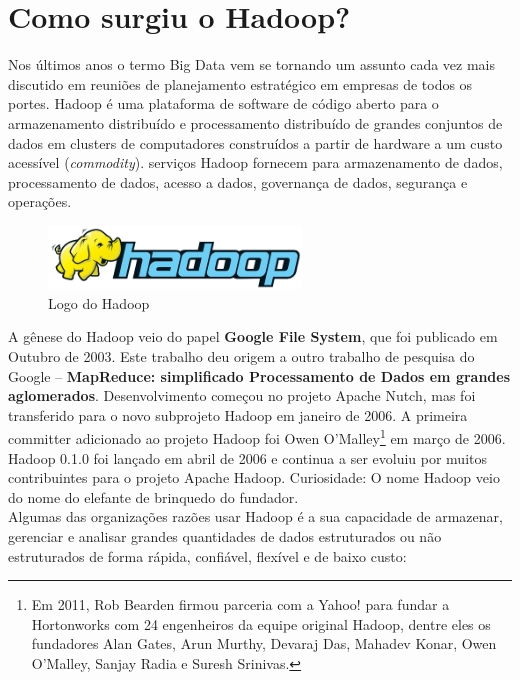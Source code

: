 \documentclass[a4paper,11pt]{article}
\begin{document}
\section{Como surgiu o Hadoop?}
Nos últimos anos o termo Big Data vem se tornando um assunto cada vez mais discutido em reuniões de planejamento estratégico em empresas de todos os portes. Hadoop é uma plataforma de software de código aberto para o armazenamento distribuído e processamento distribuído de grandes conjuntos de dados em clusters de computadores construídos a partir de hardware a um custo acessível (\textit{commodity}). serviços Hadoop fornecem para armazenamento de dados, processamento de dados, acesso a dados, governança de dados, segurança e operações.
\begin{figure}[!htb]
	\centering
	\includegraphics[width=0.6\textwidth]{imgHadoop/logo.png}
	\caption{Logo do Hadoop}
\end{figure}
A gênese do Hadoop veio do papel \textbf{Google File System}, que foi publicado em Outubro de 2003. Este trabalho deu origem a outro trabalho de pesquisa do Google – \textbf{MapReduce: simplificado Processamento de Dados em grandes aglomerados}. Desenvolvimento começou no projeto Apache Nutch, mas foi transferido para o novo subprojeto Hadoop em janeiro de 2006. A primeira committer adicionado ao projeto Hadoop foi Owen O’Malley\footnote{Em 2011, Rob Bearden firmou parceria com a Yahoo! para fundar a Hortonworks com 24 engenheiros da equipe original Hadoop, dentre eles os fundadores Alan Gates, Arun Murthy, Devaraj Das, Mahadev Konar, Owen O’Malley, Sanjay Radia e Suresh Srinivas.} em março de 2006. Hadoop 0.1.0 foi lançado em abril de 2006 e continua a ser evoluiu por muitos contribuintes para o projeto Apache Hadoop. Curiosidade: O nome Hadoop veio do nome do elefante de brinquedo do fundador. \\[2mm]
Algumas das organizações razões usar Hadoop é a sua capacidade de armazenar, gerenciar e analisar grandes quantidades de dados estruturados ou não estruturados de forma rápida, confiável, flexível e de baixo custo:
\end{document}
